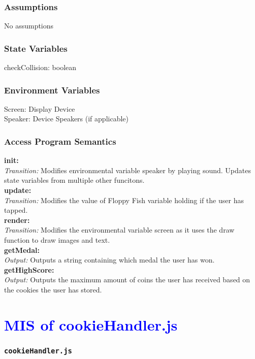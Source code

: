 \documentclass[11pt, oneside]{article}   	%
\begin{document}
\subsubsection{Assumptions}
No assumptions

\subsubsection{State Variables}
checkCollision: boolean\\



\subsubsection{Environment Variables}
Screen: Display Device\\
Speaker: Device Speakers (if applicable)\\

\subsubsection{Access Program Semantics} 
 \textbf{init:}  \\
 \textit{Transition:} Modifies environmental variable speaker by playing sound. Updates state variables from multiple other funcitons.\\
 \textbf{update:}  \\
 \textit{Transition:} Modifies the value of Floppy Fish variable holding if the user has tapped.\\
 \textbf{render:}  \\
 \textit{Transition:} Modifies the environmental variable screen as it uses the draw function to draw images and text.\\
 \textbf{getMedal:}  \\
 \textit{Output:} Outputs a string containing which medal the user has won.\\
 \textbf{getHighScore:}  \\
 \textit{Output:} Outputs the maximum amount of coins the user has received based on the cookies the user has stored.\\



\section{\textcolor{blue}{MIS of cookieHandler.js}}
\subsubsection{\texttt{cookieHandler.js}}
\end{document}
